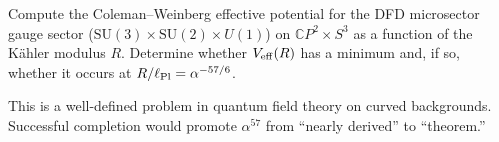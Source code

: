 \documentclass[11pt,a4paper]{article}
\newcommand{\CP}{\mathbb{C}P}
\newcommand{\alphafine}{\alpha}
\begin{document}
\begin{tcolorbox}[colback=green!5!white, colframe=green!60!black,
  title=\textbf{Priority Computation to Close the Gap}]
Compute the Coleman--Weinberg effective potential for the DFD
microsector gauge sector ($\mathrm{SU}(3) \times \mathrm{SU}(2)
\times U(1)$) on $\CP^2 \times S^3$ as a function of the K\"ahler
modulus $R$. Determine whether $V_{\rm eff}(R)$ has a minimum and, if
so, whether it occurs at $R/\ell_{\rm Pl} = \alphafine^{-57/6}$.

This is a well-defined problem in quantum field theory on curved
backgrounds. Successful completion would promote $\alpha^{57}$ from
``nearly derived'' to ``theorem.''
\end{tcolorbox}
\end{document}
